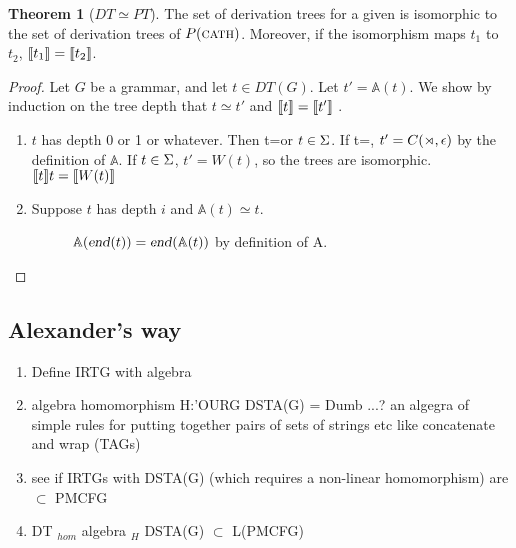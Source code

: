 \documentclass[12pt]{article}
\theoremstyle{definition}
\newtheorem{thm}{Theorem}[section]
\begin{document}
\begin{thm}[$DT \simeq PT$]
  The set of derivation trees for a given \OURG is isomorphic to the
  set of derivation trees of $P(\text{\textsc{cath}})$. Moreover, if the isomorphism
  maps $t_1$ to $t_2$, $\llbracket t_1 \rrbracket = \llbracket t_2 \rrbracket$.
\end{thm}

\begin{proof}


  Let $G$ be a \OURG grammar, and let  $t\in DT(G)$. Let
  $t'=\mathbb{A}(t)$. We show by induction on the tree depth that
  $t\simeq t'$ and $\llbracket t \rrbracket = \llbracket t' \rrbracket$ . 

  \begin{enumerate}
  \item $t$ has depth 0 or 1 or whatever. Then t=\start or
    $t\in\Sigma$. If t=\start, $t'=C(\rtimes,\epsilon)$ by the definition of
    $\mathbb{A}$. If $t\in\Sigma$, $t'=W(t)$, so the trees are
    isomorphic. $\llbracket t \rrbracket t = \llbracket W(t) \rrbracket$
  \item Suppose $t$ has depth $i$ and $\mathbb{A}(t)\simeq t$.
    \begin{description}
    \item[\ed] $\mathbb{A}(\text{\textsl{end}}(t)) = \text{\textsl{end}}(\mathbb{A}(t))$ by definition
      of A. 
    \end{description}
  \end{enumerate}
  
  
\end{proof}












\subsection{Alexander's way}
\label{sec:alexanders-way}

\begin{enumerate}
\item Define IRTG with \OURG algebra
\item algebra homomorphism H:'OURG \arr DSTA(G) = Dumb ...? an algegra of simple rules for putting together pairs of sets of strings etc like concatenate and wrap (TAGs)
\item see if IRTGs with DSTA(G) (which requires a non-linear homomorphism) are $\subset$ PMCFG
\item \OURG \arr DT \arr$_{hom}$ \OURG algebra \arr$_{H}$ DSTA(G) $\subset$ L(PMCFG) 
\end{enumerate}
\end{document}
